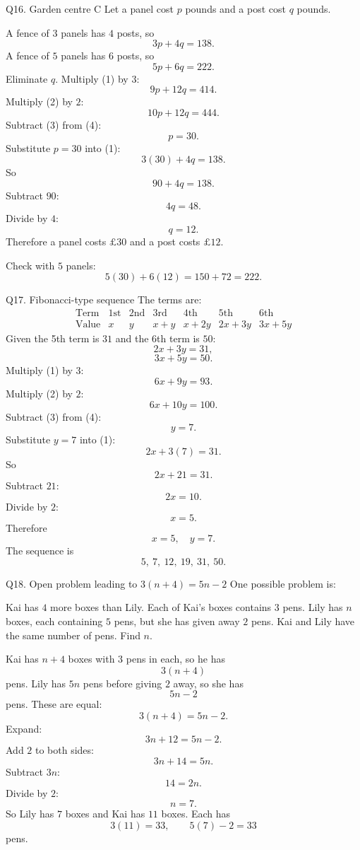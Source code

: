 \documentclass[11pt,a4paper]{article}
\begin{document}
\begin{solbox}{Q16. Garden centre C}
Let a panel cost \(p\) pounds and a post cost \(q\) pounds.

A fence of \(3\) panels has \(4\) posts, so
\[
3p+4q=138. \tag{1}
\]
A fence of \(5\) panels has \(6\) posts, so
\[
5p+6q=222. \tag{2}
\]
Eliminate \(q\). Multiply (1) by \(3\):
\[
9p+12q=414. \tag{3}
\]
Multiply (2) by \(2\):
\[
10p+12q=444. \tag{4}
\]
Subtract (3) from (4):
\[
p=30.
\]
Substitute \(p=30\) into (1):
\[
3(30)+4q=138.
\]
So
\[
90+4q=138.
\]
Subtract \(90\):
\[
4q=48.
\]
Divide by \(4\):
\[
q=12.
\]
Therefore a panel costs \(\boxed{\pounds30}\) and a post costs \(\boxed{\pounds12}\).

Check with \(5\) panels:
\[
5(30)+6(12)=150+72=222.
\]
\end{solbox}

\begin{solbox}{Q17. Fibonacci-type sequence}
The terms are:
\[
\begin{array}{c|cccccc}
\text{Term} & 1\text{st} & 2\text{nd} & 3\text{rd} & 4\text{th} & 5\text{th} & 6\text{th}\\ \hline
\text{Value} & x & y & x+y & x+2y & 2x+3y & 3x+5y
\end{array}
\]
Given the 5th term is \(31\) and the 6th term is \(50\):
\[
2x+3y=31, \tag{1}
\]
\[
3x+5y=50. \tag{2}
\]
Multiply (1) by \(3\):
\[
6x+9y=93. \tag{3}
\]
Multiply (2) by \(2\):
\[
6x+10y=100. \tag{4}
\]
Subtract (3) from (4):
\[
y=7.
\]
Substitute \(y=7\) into (1):
\[
2x+3(7)=31.
\]
So
\[
2x+21=31.
\]
Subtract \(21\):
\[
2x=10.
\]
Divide by \(2\):
\[
x=5.
\]
Therefore
\[
\boxed{x=5,\quad y=7}.
\]
The sequence is
\[
\boxed{5,\ 7,\ 12,\ 19,\ 31,\ 50}.
\]
\end{solbox}

\begin{solbox}{Q18. Open problem leading to \(3(n+4)=5n-2\)}
One possible problem is:

Kai has \(4\) more boxes than Lily. Each of Kai's boxes contains \(3\) pens. Lily has \(n\) boxes, each containing \(5\) pens, but she has given away \(2\) pens. Kai and Lily have the same number of pens. Find \(n\).

Kai has \(n+4\) boxes with \(3\) pens in each, so he has
\[
3(n+4)
\]
pens. Lily has \(5n\) pens before giving \(2\) away, so she has
\[
5n-2
\]
pens. These are equal:
\[
3(n+4)=5n-2.
\]
Expand:
\[
3n+12=5n-2.
\]
Add \(2\) to both sides:
\[
3n+14=5n.
\]
Subtract \(3n\):
\[
14=2n.
\]
Divide by \(2\):
\[
n=7.
\]
So Lily has \(7\) boxes and Kai has \(11\) boxes. Each has
\[
3(11)=33,\qquad 5(7)-2=33
\]
pens.
\end{solbox}
\end{document}
